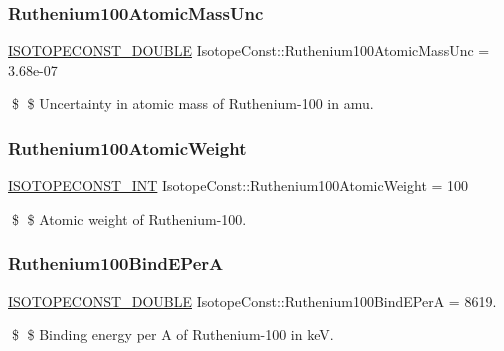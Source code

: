 \subsubsection{\texorpdfstring{Ruthenium100\+Atomic\+Mass\+Unc}{Ruthenium100AtomicMassUnc}}
{\footnotesize\ttfamily \mbox{\hyperlink{group___isotope_const-_macros_ga8f45a7272ce02c0b4c65c44636ed719a}{I\+S\+O\+T\+O\+P\+E\+C\+O\+N\+S\+T\+\_\+\+D\+O\+U\+B\+LE}} Isotope\+Const\+::\+Ruthenium100\+Atomic\+Mass\+Unc = 3.\+68e-\/07}

\$ \$ Uncertainty in atomic mass of Ruthenium-\/100 in amu. \mbox{\label{group___isotope_const-_ruthenium-_ru100_gaa76abbbf0d864b44543ec0c791966f2a}} 
\subsubsection{\texorpdfstring{Ruthenium100\+Atomic\+Weight}{Ruthenium100AtomicWeight}}
{\footnotesize\ttfamily \mbox{\hyperlink{group___isotope_const-_macros_ga5f18360b3e99483a35c32d789e62621c}{I\+S\+O\+T\+O\+P\+E\+C\+O\+N\+S\+T\+\_\+\+I\+NT}} Isotope\+Const\+::\+Ruthenium100\+Atomic\+Weight = 100}

\$ \$ Atomic weight of Ruthenium-\/100. \mbox{\label{group___isotope_const-_ruthenium-_ru100_gaddaecc89de6ebbba5def6510688cf369}} 
\subsubsection{\texorpdfstring{Ruthenium100\+Bind\+E\+PerA}{Ruthenium100BindEPerA}}
{\footnotesize\ttfamily \mbox{\hyperlink{group___isotope_const-_macros_ga8f45a7272ce02c0b4c65c44636ed719a}{I\+S\+O\+T\+O\+P\+E\+C\+O\+N\+S\+T\+\_\+\+D\+O\+U\+B\+LE}} Isotope\+Const\+::\+Ruthenium100\+Bind\+E\+PerA = 8619.}

\$ \$ Binding energy per A of Ruthenium-\/100 in keV. \mbox{\label{group___isotope_const-_ruthenium-_ru100_ga713b38ad4996301b98e154fe6fcd0eb9}} 
